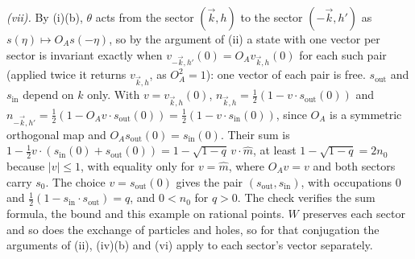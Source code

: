\emph{(vii).} By (i)(b), $\theta$ acts from the sector $(\vec k, h)$ to the sector $(-\vec k, h')$ as $s(\eta) \mapsto O_{A}s(-\eta)$, so by the argument of (ii) a state with one vector per sector is invariant exactly when $v_{-\vec k, h'}(0) = O_{A}v_{\vec k, h}(0)$ for each such pair (applied twice it returns $v_{\vec k, h}$, as $O_{A}^{2} = 1$): one vector of each pair is free. $s_{\mathrm{out}}$ and $s_{\mathrm{in}}$ depend on $k$ only. With $v = v_{\vec k, h}(0)$, $n_{\vec k, h} = \tfrac12(1 - v\cdot s_{\mathrm{out}}(0))$ and $n_{-\vec k, h'} = \tfrac12(1 - O_{A}v\cdot s_{\mathrm{out}}(0)) = \tfrac12(1 - v\cdot s_{\mathrm{in}}(0))$, since $O_{A}$ is a symmetric orthogonal map and $O_{A}s_{\mathrm{out}}(0) = s_{\mathrm{in}}(0)$. Their sum is $1 - \tfrac12v\cdot(s_{\mathrm{in}}(0) + s_{\mathrm{out}}(0)) = 1 - \sqrt{1 - q}\,v\cdot\hat m$, at least $1 - \sqrt{1 - q} = 2n_{0}$ because $|v| \le 1$, with equality only for $v = \hat m$, where $O_{A}v = v$ and both sectors carry $s_{0}$. The choice $v = s_{\mathrm{out}}(0)$ gives the pair $(s_{\mathrm{out}}, s_{\mathrm{in}})$, with occupations $0$ and $\tfrac12(1 - s_{\mathrm{in}}\cdot s_{\mathrm{out}}) = q$, and $0 < n_{0}$ for $q > 0$. The check verifies the sum formula, the bound and this example on rational points. $W$ preserves each sector and so does the exchange of particles and holes, so for that conjugation the arguments of (ii), (iv)(b) and (vi) apply to each sector's vector separately.

